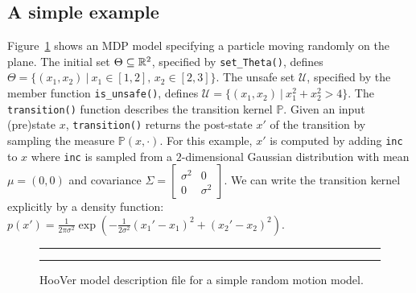 \documentclass[11pt]{report}
\newcommand{\sayan}[1]{\textcolor{blue}{#1}}
\newcommand{\num}[1]{\relax\ifmmode \mathbb #1\else $\mathbb #1$\fi}
\newcommand{\reals}{{\num R}}                    %
\newcommand{\X}{\mathcal{X}}
\newcommand{\phit}[3]{{p_{#1,#2}{(#3)}}}
\newcommand{\Unsafe}{\mathcal{U}}
\newcommand{\toolname}{{{\sf HooVer}\xspace}}
\newcommand{\two}[4]{
  \parbox{.95\columnwidth}{\vspace{1pt} \vfill
    \parbox[t]{#1\columnwidth}{#3}%
    \parbox[t]{#2\columnwidth}{#4}%
  }}
\begin{document}
\subsection*{A simple example}
\label{ex:simple}
Figure~\ref{fig:brownian} shows an MDP model specifying a particle moving randomly on the  plane. 
%
The initial set $\Theta \subseteq \reals^2$, specified by \texttt{set\_Theta()},  defines $\Theta = \{(x_1, x_2)~|~x_1 \in [1,2],\,x_2 \in [2,3]\}$. 
The unsafe set $\Unsafe$,  specified by the member function \texttt{is\_unsafe()}, 
defines $\Unsafe = \{(x_1, x_2)~|~x_1^2+x_2^2 > 4\}$. 
%
The \texttt{transition()} 
function describes the transition kernel $\mathbb{P}$. Given an input (pre)state $x$, \texttt{transition()} returns the post-state $x'$ of the transition by sampling  the measure $\mathbb{P}(x, \cdot)$. For this example, $x'$ is computed by adding \texttt{inc} to $x$ where \texttt{inc} is sampled from a $2$-dimensional Gaussian distribution with mean $\mu = (0, 0)$ %
and covariance $\Sigma = \begin{bmatrix} \sigma^2 & 0\\ 0 & \sigma^2 \end{bmatrix}$.
%
We can write the  transition kernel explicitly by a density function: $ p(x')= \frac{1}{2\pi \sigma^2} \exp(-\frac{1}{2 \sigma^2}(x_1'-x_1)^2+(x_2'-x_2)^2)$.

\begin{figure}
	\centering
	\hrule
	\two{.46}{.54}
	{}
	{}
	\hrule
	\caption{\small \toolname{} model description file for a simple random motion model.}
	\label{fig:brownian}
\end{figure}
\end{document}
